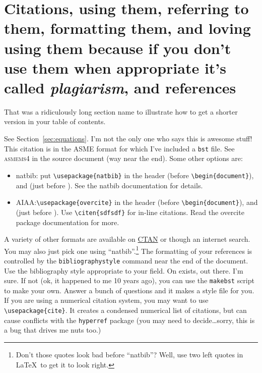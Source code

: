 \documentclass[12pt]{report}
\begin{document}
\section[Citations/References (short form of section name)]{Citations, using them, referring to them, formatting them, and loving using them because if you don't use them when appropriate it's called \emph{plagiarism}, and references}
That was a ridiculously long section name to illustrate how to get a shorter version in your table of contents.

See Section~\ref{sec:equations}. I'm not the only one who says this is awesome stuff\cite{Mortara2004}!
This citation is in the ASME format for which I've included a \verb'bst'
file. See \textsc{asmems4} in the source document (way near the end). Some  other options are:
\begin{itemize}
\item natbib:  put \verb'\usepackage{natbib}' in the header (before \verb'\begin{document}'), and \verb'' (just before \verb'').  See the natbib documentation for details.
\item AIAA:\@put \verb'\usepackage{overcite}' in the header (before \verb'\begin{document}'), and \verb'' (just before \verb''). Use \verb'\citen{sdfsdf}' for in-line citations. Read the overcite package documentation for more.
\end{itemize}

A variety of other formats are available on \href{http://www.ctan.org}{CTAN} or though an internet search. You may also just pick one using ``natbib''.\footnote{Don't those quotes look bad before ``natbib''? Well, use two left quotes in \LaTeX\ to get it to look right.}  The formatting of your references is controlled by the \verb'bibliographystyle' command near the end of the document. Use the bibliography style appropriate to your field. On exists, out there. I'm sure. If not (ok, it happened to me 10 years ago), you can use the \verb'makebst' script to make your own. Answer a bunch of questions and it makes a style file for you. If you are using a numerical citation system, you may want to use \verb'\usepackage{cite}'. It creates a condensed numerical list of citations, but can cause conflicts with the \verb'hyperref' package (you may need to decide\ldots sorry, this is a bug that drives me nuts too.)

\end{document}
